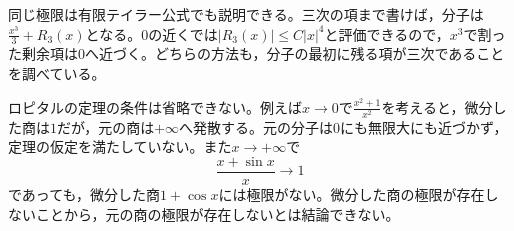 同じ極限は有限テイラー公式でも説明できる。三次の項まで書けば，分子は$\frac{x^3}{3}+R_3(x)$となる。$0$の近くでは$|R_3(x)|\leq C|x|^4$と評価できるので，$x^3$で割った剰余項は$0$へ近づく。どちらの方法も，分子の最初に残る項が三次であることを調べている。

ロピタルの定理の条件は省略できない。例えば$x\to0$で$\frac{x^2+1}{x^2}$を考えると，微分した商は$1$だが，元の商は$+\infty$へ発散する。元の分子は$0$にも無限大にも近づかず，定理の仮定を満たしていない。また$x\to+\infty$で
\[
 \frac{x+\sin x}{x}\longrightarrow1
\]
であっても，微分した商$1+\cos x$には極限がない。微分した商の極限が存在しないことから，元の商の極限が存在しないとは結論できない。

